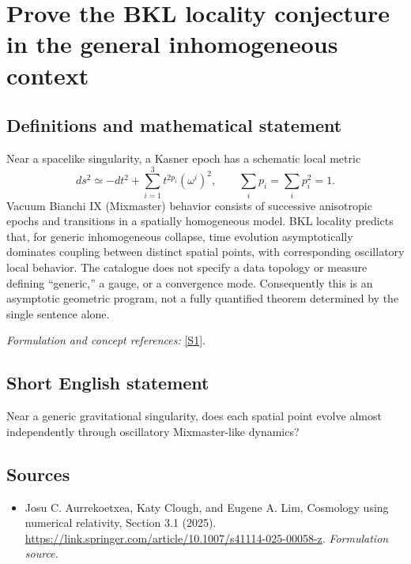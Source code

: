 \documentclass[11pt]{article}
\begin{document}
\section*{\texorpdfstring{Prove the BKL locality conjecture in the general inhomogeneous context}{Prove the BKL locality conjecture in the general inhomogeneous context}}\label{statement}
\subsection{Definitions and mathematical statement}
Near a spacelike singularity, a Kasner epoch has a schematic local metric
\[
 ds^2\simeq-dt^2+\sum_{i=1}^3t^{2p_i}(\omega^i)^2,\qquad
 \sum_i p_i=\sum_i p_i^2=1.
\]
Vacuum Bianchi IX (Mixmaster) behavior consists of successive anisotropic epochs and transitions in a spatially homogeneous model. BKL locality predicts that, for generic inhomogeneous collapse, time evolution asymptotically dominates coupling between distinct spatial points, with corresponding oscillatory local behavior. The catalogue does not specify a data topology or measure defining ``generic,'' a gauge, or a convergence mode. Consequently this is an asymptotic geometric program, not a fully quantified theorem determined by the single sentence alone.
\par\smallskip\textit{Formulation and concept references:} \href{https://link.springer.com/article/10.1007/s41114-025-00058-z}{[S1]}.

\subsection{Short English statement}
Near a generic gravitational singularity, does each spatial point evolve almost independently through oscillatory Mixmaster-like dynamics?
\subsection{Sources}
\begin{itemize}
\item[S1]Josu C. Aurrekoetxea, Katy Clough, and Eugene A. Lim, Cosmology using numerical relativity, Section 3.1 (2025).
\url{https://link.springer.com/article/10.1007/s41114-025-00058-z}.
\textit{Formulation source.}
\end{itemize}
\end{document}
